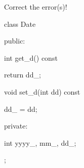 Correct the error(s)!



\begin{consolethree}[escapeinside=||]

class Date

{

public:

    int get_d() const

    {

        return dd_;

    }

    void set_d(int dd) const

    {

        dd_ = dd;

    }

private:

    int yyyy_, mm_, dd_;

};

\end{consolethree}

